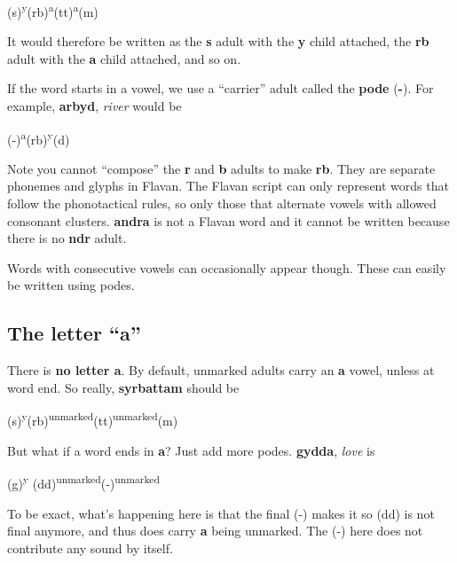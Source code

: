 \documentclass[10pt,oneside]{memoir}
\begin{document}
\begin{center}
    \Large (s)\textsuperscript{y}(rb)\textsuperscript{a}(tt)\textsuperscript{a}(m)
\end{center}

It would therefore be written as the \textbf{s} adult with the \textbf{y} child attached, the \textbf{rb} adult with the \textbf{a} child attached, and so on.

If the word starts in a vowel, we use a ``carrier'' adult called the \textbf{pode} (\textbf{-}). For example, \textbf{arbyd}, \emph{river} would be

\begin{center}
    \LARGE (-)\textsuperscript{a}(rb)\textsuperscript{y}(d)
\end{center}

Note you cannot ``compose'' the \textbf{r} and \textbf{b} adults to make \textbf{rb}. They are separate phonemes and glyphs in Flavan. The Flavan script can only represent words that follow the phonotactical rules, so only those that alternate vowels with allowed consonant clusters. \textbf{andra} is not a Flavan word and it cannot be written because there is no \textbf{ndr} adult.

Words with consecutive vowels can occasionally appear though. These can easily be written using podes.

\subsection{The letter ``a''}

There is \textbf{no letter a}. By default, unmarked adults carry an \textbf{a} vowel, unless at word end. So really, \textbf{syrbattam} should be

\begin{center}
    \Large (s)\textsuperscript{y}(rb)\textsuperscript{unmarked}(tt)\textsuperscript{unmarked}(m)
\end{center}

But what if a word ends in \textbf{a}? Just add more podes. \textbf{gydda}, \emph{love} is

\begin{center}
    \Large (g)\textsuperscript{y} (dd)\textsuperscript{unmarked}(-)\textsuperscript{unmarked}
\end{center}

To be exact, what's happening here is that the final (-) makes it so (dd) is not final anymore, and thus does carry \textbf{a} being unmarked. The (-) here does not contribute any sound by itself.
\end{document}

